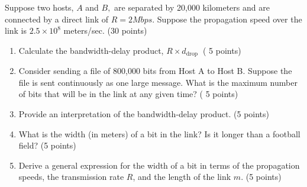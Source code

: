 \begin{exercise}[]{Suppose two hosts, $A$ and $B,$ are separated by 20,000 kilometers and are connected by a direct link of $R=2 M b p s .$ Suppose the propagation speed over the link is $2.5 \times 10^{8}$ meters/sec. (30 points)

    \begin{enumerate}
        \item Calculate the bandwidth-delay product, $R \times d_{\text {drop }}$ ( 5 points)
        \item Consider sending a file of 800,000 bits from Host A to Host B. Suppose the file is sent continuously as one large message. What is the maximum number of bits that will be in the link at any given time? ( 5 points)
        \item Provide an interpretation of the bandwidth-delay product. (5 points)
        \item What is the width (in meters) of a bit in the link? Is it longer than a football field? (5 points)
        \item Derive a general expression for the width of a bit in terms of the propagation speeds, the transmission rate $R$, and the length of the link $m$. (5 points)
    \end{enumerate}}
  \begin{solution}
  \par{~}
  \end{solution}
  \label{ex3}
\end{exercise}



